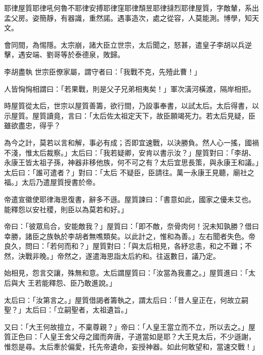 
\begin{pinyinscope}

 耶律屋質耶律吼何魯不耶律安搏耶律窪耶律頹昱耶律撻烈耶律屋質，字敵輦，系出孟父房。姿簡靜，有器識，重然諾。遇事造次，處之從容，人莫能測。博學，知天文。



 會同間，為惕隱。太宗崩，諸大臣立世宗，太后聞之，怒甚，遣皇子李胡以兵逆擊，遇安端、劉哥等於泰德泉，敗歸。



 李胡盡執
 世宗臣僚家屬，謂守者曰：「我戰不克，先殪此曹！」



 人皆恟恟相謂曰：「若果戰，則是父子兄弟相夷矣！」軍次潢河橫渡，隔岸相拒。



 時屋質從太后，世宗以屋質善籌，欲行間，乃設事奉書，以試太后。太后得書，以示屋質。屋質讀竟，言曰：「太后佐太祖定天下，故臣願竭死力。若太后見疑，臣雖欲盡忠，得乎？



 為今之計，莫若以言和解，事必有成；否即宜速戰，以決勝負。然人心一搖，國禍不淺，惟太后裁察。」太后曰：「我若疑卿，安肯以書示汝？」屋質對曰：「李胡、永康王皆太祖子孫，神器非移他族，何不可之有？太后宜思長策，與永康王和議。」太后曰：「誰可遣者？」對曰：「太后
 不疑臣，臣請往。萬一永康王見聽，廟社之福。」太后乃遣屋質授書於帝。



 帝遣宣徽使耶律海思復書，辭多不遜。屋質諫曰：「書意如此，國家之優未艾也。能釋怨以安社稷，則臣以為莫若和好。」



 帝曰：「彼眾烏合，安能敵我？」屋質曰：「即不敵，奈骨肉何！況未知孰勝？借曰幸勝，諸臣之族執於李胡者無噍類矣。以此計之，惟和為善。」左右聞者失色。帝良久，問曰：「若何而和？」屋質對曰：「與太后相見，各紓忿恚，和之不難；不然，決戰非晚。」帝然之，遂遣海思詣太后約和。往返數日，議乃定。



 始相見，怨言交讓，殊無和意。太后謂屋質曰：「汝當為我畫之。」屋質進曰：「太后與大
 王若能釋怨、臣乃敢進說。」



 太后曰：「汝第言之。」屋質借謁者籌執之，謂太后曰：「昔人皇正在，何故立嗣聖？」太后曰：「立嗣聖者，太祖遺旨。」



 又曰：「大王何故擅立，不稟尊親？」帝曰：「人皇王當立而不立，所以去之。」屋質正色曰：「人皇王舍父母之國而奔唐，子道當如是耶？大王見太后，不少遜謝，惟怨是尋。太后牽於偏愛，托先帝遺命，妄授神器。如此何敢望和，當速交戰！」




\end{pinyinscope}

